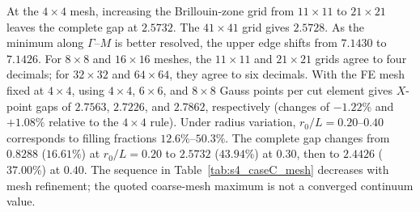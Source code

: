 \documentclass[pdflatex,sn-basic,Numbered]{sn-jnl}
\begin{document}
At the $4\times4$ mesh, increasing the Brillouin-zone grid from $11\times11$ to $21\times21$ leaves the complete gap at $2.5732$. The $41\times41$ grid gives $2.5728$. As the minimum along $\Gamma$--$M$ is better resolved, the upper edge shifts from $7.1430$ to $7.1426$. For $8\times8$ and $16\times16$ meshes, the $11\times11$ and $21\times21$ grids agree to four decimals; for $32\times32$ and $64\times64$, they agree to six decimals. With the FE mesh fixed at $4\times4$, using $4\times4$, $6\times6$, and $8\times8$ Gauss points per cut element gives $X$-point gaps of $2.7563$, $2.7226$, and $2.7862$, respectively (changes of $-1.22\%$ and $+1.08\%$ relative to the $4\times4$ rule). Under radius variation, $r_0/L=0.20$--$0.40$ corresponds to filling fractions $12.6\%$--$50.3\%$. The complete gap changes from $0.8288$ ($16.61\%$) at $r_0/L=0.20$ to $2.5732$ ($43.94\%$) at $0.30$, then to $2.4426$ ($37.00\%$) at $0.40$. The sequence in Table~\ref{tab:s4_caseC_mesh} decreases with mesh refinement; the quoted coarse-mesh maximum is not a converged continuum value.


\end{document}
